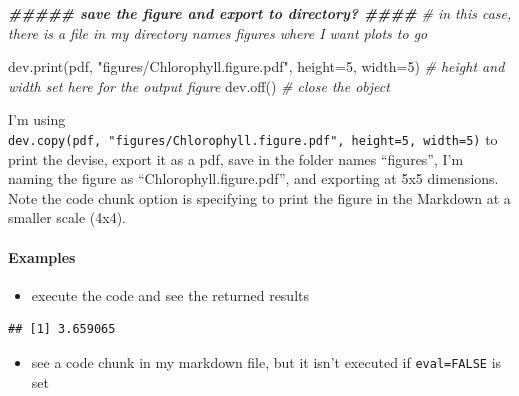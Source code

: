 \documentclass[
]{article}
\newenvironment{Shaded}{\begin{snugshade}}{\end{snugshade}}
\newcommand{\AttributeTok}[1]{\textcolor[rgb]{0.77,0.63,0.00}{#1}}
\newcommand{\CommentTok}[1]{\textcolor[rgb]{0.56,0.35,0.01}{\textit{#1}}}
\newcommand{\DecValTok}[1]{\textcolor[rgb]{0.00,0.00,0.81}{#1}}
\newcommand{\DocumentationTok}[1]{\textcolor[rgb]{0.56,0.35,0.01}{\textbf{\textit{#1}}}}
\newcommand{\FunctionTok}[1]{\textcolor[rgb]{0.00,0.00,0.00}{#1}}
\newcommand{\NormalTok}[1]{#1}
\newcommand{\OtherTok}[1]{\textcolor[rgb]{0.56,0.35,0.01}{#1}}
\newcommand{\SpecialCharTok}[1]{\textcolor[rgb]{0.00,0.00,0.00}{#1}}
\newcommand{\StringTok}[1]{\textcolor[rgb]{0.31,0.60,0.02}{#1}}
\providecommand{\tightlist}{%
  \setlength{\itemsep}{0pt}\setlength{\parskip}{0pt}}
\begin{document}
\begin{Shaded}
\begin{Highlighting}[]
\DocumentationTok{\#\#\#\#\# save the figure and export to directory? \#\#\#\#}
\CommentTok{\# in this case, there is a file in my directory names \textquotesingle{}figures\textquotesingle{} where I want plots to go}

\FunctionTok{dev.print}\NormalTok{(pdf, }\StringTok{"figures/Chlorophyll.figure.pdf"}\NormalTok{, }\AttributeTok{height=}\DecValTok{5}\NormalTok{, }\AttributeTok{width=}\DecValTok{5}\NormalTok{) }
\CommentTok{\# height and width set here for the output figure}
\FunctionTok{dev.off}\NormalTok{() }\CommentTok{\# close the object}
\end{Highlighting}
\end{Shaded}

I'm using
\texttt{dev.copy(pdf,\ "figures/Chlorophyll.figure.pdf",\ height=5,\ width=5)}
to print the devise, export it as a pdf, save in the folder names
``figures'', I'm naming the figure as ``Chlorophyll.figure.pdf'', and
exporting at 5x5 dimensions. Note the code chunk option is specifying to
print the figure in the Markdown at a smaller scale (4x4).

\hypertarget{examples}{%
\paragraph{Examples}\label{examples}}

\begin{itemize}
\tightlist
\item
  execute the code and see the returned results
\end{itemize}

\begin{Shaded}
\end{Shaded}

\begin{verbatim}
## [1] 3.659065
\end{verbatim}

\begin{itemize}
\tightlist
\item
  see a code chunk in my markdown file, but it isn't executed if
  \texttt{eval=FALSE} is set
\end{itemize}
\end{document}
